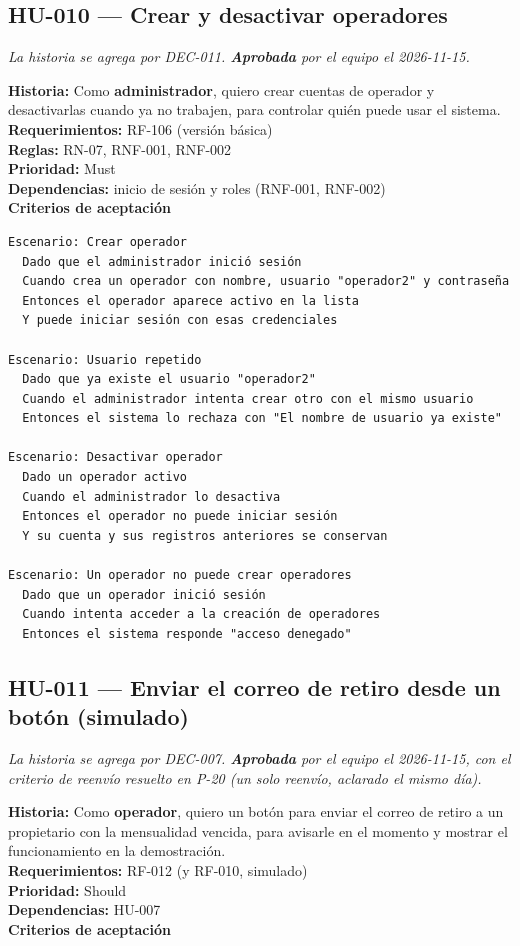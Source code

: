 \subsection{HU-010 — Crear y desactivar operadores}
\textit{La historia se agrega por DEC-011. \textbf{Aprobada} por el equipo el 2026-11-15.}

\textbf{Historia:} Como \textbf{administrador}, quiero crear cuentas de operador y desactivarlas cuando ya no trabajen, para controlar quién puede usar el sistema.\\
\textbf{Requerimientos:} RF-106 (versión básica)\\
\textbf{Reglas:} RN-07, RNF-001, RNF-002\\
\textbf{Prioridad:} Must\\
\textbf{Dependencias:} inicio de sesión y roles (RNF-001, RNF-002)\\
\textbf{Criterios de aceptación}

\begin{lstlisting}[style=gherkin]
Escenario: Crear operador
  Dado que el administrador inició sesión
  Cuando crea un operador con nombre, usuario "operador2" y contraseña
  Entonces el operador aparece activo en la lista
  Y puede iniciar sesión con esas credenciales

Escenario: Usuario repetido
  Dado que ya existe el usuario "operador2"
  Cuando el administrador intenta crear otro con el mismo usuario
  Entonces el sistema lo rechaza con "El nombre de usuario ya existe"

Escenario: Desactivar operador
  Dado un operador activo
  Cuando el administrador lo desactiva
  Entonces el operador no puede iniciar sesión
  Y su cuenta y sus registros anteriores se conservan

Escenario: Un operador no puede crear operadores
  Dado que un operador inició sesión
  Cuando intenta acceder a la creación de operadores
  Entonces el sistema responde "acceso denegado"
\end{lstlisting}

\subsection{HU-011 — Enviar el correo de retiro desde un botón (simulado)}
\textit{La historia se agrega por DEC-007. \textbf{Aprobada} por el equipo el 2026-11-15, con el criterio de reenvío resuelto en P-20 (un solo reenvío, aclarado el mismo día).}

\textbf{Historia:} Como \textbf{operador}, quiero un botón para enviar el correo de retiro a un propietario con la mensualidad vencida, para avisarle en el momento y mostrar el funcionamiento en la demostración.\\
\textbf{Requerimientos:} RF-012 (y RF-010, simulado)\\
\textbf{Prioridad:} Should\\
\textbf{Dependencias:} HU-007\\
\textbf{Criterios de aceptación}

